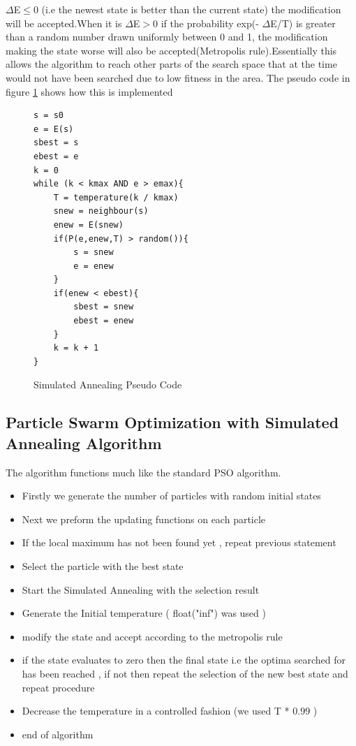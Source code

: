\documentclass{article}[]
\begin{document}
$\Delta$E$\le$0 (i.e the newest state is better than the current state) the modification will be accepted.When it is $\Delta$E$>$0 if the probability exp(- $\Delta$E/T) is greater than a random number drawn uniformly between 0 and 1, the modification making the state worse will also be accepted(Metropolis rule\cite{Metropolis1953}).Essentially this allows the algorithm to reach other parts of the search space that at the time would not have been searched due to low fitness in the area. The pseudo code in figure \ref{SA-Code} shows how this is implemented
\cite{Russell2003}

\newpage
\begin{figure}[bottom]
\centering
\begin{lstlisting}
s = s0
e = E(s)
sbest = s
ebest = e
k = 0
while (k < kmax AND e > emax){
	T = temperature(k / kmax)
	snew = neighbour(s)
	enew = E(snew)
	if(P(e,enew,T) > random()){
		s = snew
		e = enew
	}
	if(enew < ebest){
		sbest = snew
		ebest = enew
	}
	k = k + 1
}
\end{lstlisting}
\caption{Simulated Annealing Pseudo Code}%
\label{SA-Code}%
\end{figure}
\newpage
\subsection{Particle Swarm Optimization with Simulated Annealing Algorithm}
The algorithm functions much like the standard PSO algorithm.
\begin{itemize}
\item Firstly we generate the number of particles with random initial states
\item Next we preform the updating functions on each particle
\item If the local maximum has not been found yet , repeat previous statement
\item Select the particle with the best state
\item Start the Simulated Annealing with the selection result
\item Generate the Initial temperature ( float("inf") was used )
\item modify the state and accept according to the metropolis rule\cite{Metropolis1953}
\item if the state evaluates to zero then the final state i.e the optima searched for has been reached , if not then repeat the selection of the new best state and repeat procedure
\item Decrease the temperature in a controlled fashion (we used T * 0.99 )
\item end of algorithm
\end{itemize}
\label{psosaAlg}
\end{document}
